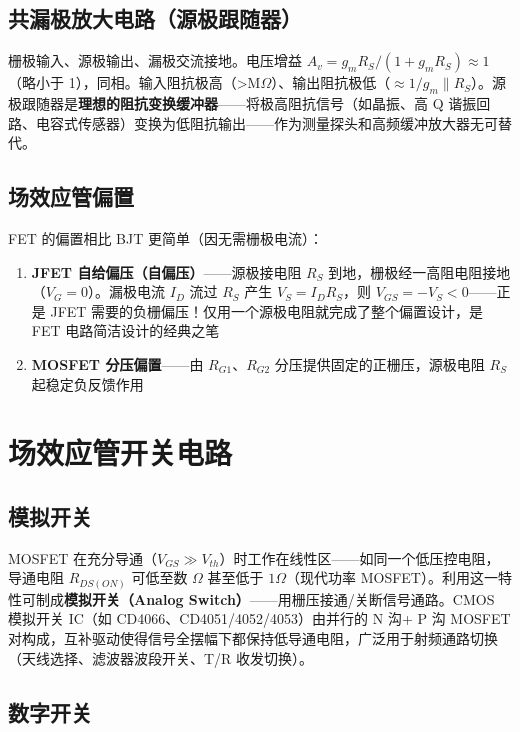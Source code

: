 \documentclass[12pt,UTF8]{ctexbook}
\begin{document}
\subsection{共漏极放大电路（源极跟随器）}

栅极输入、源极输出、漏极交流接地。电压增益 $A_v = g_m R_S/(1+g_m R_S) \approx 1$（略小于 1），同相。输入阻抗极高（>M$\Omega$）、输出阻抗极低（$\approx 1/g_m\parallel R_S$）。源极跟随器是\textbf{理想的阻抗变换缓冲器}——将极高阻抗信号（如晶振、高 Q 谐振回路、电容式传感器）变换为低阻抗输出——作为测量探头和高频缓冲放大器无可替代。

\subsection{场效应管偏置}

FET 的偏置相比 BJT 更简单（因无需栅极电流）：
\begin{enumerate}
\item \textbf{JFET 自给偏压（自偏压）}——源极接电阻 $R_S$ 到地，栅极经一高阻电阻接地（$V_G=0$）。漏极电流 $I_D$ 流过 $R_S$ 产生 $V_S = I_D R_S$，则 $V_{GS} = -V_S < 0$——正是 JFET 需要的负栅偏压！仅用一个源极电阻就完成了整个偏置设计，是 FET 电路简洁设计的经典之笔
\item \textbf{MOSFET 分压偏置}——由 $R_{G1}$、$R_{G2}$ 分压提供固定的正栅压，源极电阻 $R_S$ 起稳定负反馈作用
\end{enumerate}

\section{场效应管开关电路}
\label{sec:fet_switch}

\subsection{模拟开关}

MOSFET 在充分导通（$V_{GS}\gg V_{th}$）时工作在线性区——如同一个低压控电阻，导通电阻 $R_{DS(ON)}$ 可低至数 $\Omega$ 甚至低于 $1\Omega$（现代功率 MOSFET）。利用这一特性可制成\textbf{模拟开关（Analog Switch）}——用栅压接通/关断信号通路。CMOS 模拟开关 IC（如 CD4066、CD4051/4052/4053）由并行的 N 沟+ P 沟 MOSFET 对构成，互补驱动使得信号全摆幅下都保持低导通电阻，广泛用于射频通路切换（天线选择、滤波器波段开关、T/R 收发切换）。

\subsection{数字开关}
\end{document}
